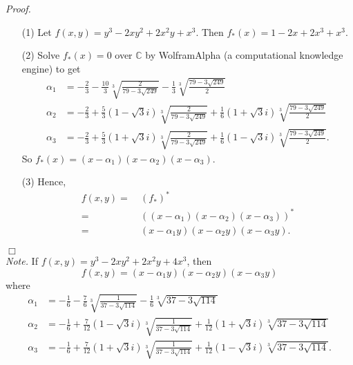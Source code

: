 \documentclass{article}
\begin{document}
\emph{Proof.}
\begin{enumerate}
\item[(1)]
  Let $f(x,y) = y^3 - 2xy^2 + 2x^2y + x^3$.
  Then $f_*(x) = 1 - 2x + 2x^3 + x^3$.

\item[(2)]
  Solve $f_*(x) = 0$ over $\mathbb{C}$ by WolframAlpha (a computational knowledge engine) to get
  \begin{align*}
    \alpha_1
    &= - \frac{2}{3} - \frac{10}{3} \sqrt[3]{\frac{2}{79 - 3\sqrt{249}}}
      - \frac{1}{3} \sqrt[3]{\frac{79 - 3\sqrt{249}}{2}} \\
    \alpha_2
    &= - \frac{2}{3} + \frac{5}{3}(1 - \sqrt{3}i) \sqrt[3]{\frac{2}{79 - 3\sqrt{249}}}
      + \frac{1}{6}(1 + \sqrt{3}i) \sqrt[3]{\frac{79 - 3\sqrt{249}}{2}} \\
    \alpha_3
    &= - \frac{2}{3} + \frac{5}{3}(1 + \sqrt{3}i) \sqrt[3]{\frac{2}{79 - 3\sqrt{249}}}
      + \frac{1}{6}(1 - \sqrt{3}i) \sqrt[3]{\frac{79 - 3\sqrt{249}}{2}}.
  \end{align*}
  So $f_*(x) = (x - \alpha_1)(x - \alpha_2)(x - \alpha_3)$.

\item[(3)]
  Hence,
  \begin{align*}
    f(x,y)
    =& \: (f_*)^{*} \\
    =& \: ((x - \alpha_1)(x - \alpha_2)(x - \alpha_3))^{*} \\
    =& \: (x - \alpha_1 y)(x - \alpha_2 y)(x - \alpha_3 y).
  \end{align*}
\end{enumerate}
$\Box$ \\

\emph{Note.}
  If $f(x,y) = y^3 - 2xy^2 + 2x^2y + 4x^3$, then
  \[
    f(x,y) = (x - \alpha_1 y)(x - \alpha_2 y)(x - \alpha_3 y)
  \]
  where
  \begin{align*}
    \alpha_1
    &= - \frac{1}{6} - \frac{7}{6} \sqrt[3]{\frac{1}{37 - 3\sqrt{114}}}
      - \frac{1}{6} \sqrt[3]{37 - 3\sqrt{114}} \\
    \alpha_2
    &= - \frac{1}{6} + \frac{7}{12}(1 - \sqrt{3}i) \sqrt[3]{\frac{1}{37 - 3\sqrt{114}}}
      + \frac{1}{12}(1 + \sqrt{3}i) \sqrt[3]{37 - 3\sqrt{114}} \\
    \alpha_3
    &= - \frac{1}{6} + \frac{7}{12}(1 + \sqrt{3}i) \sqrt[3]{\frac{1}{37 - 3\sqrt{114}}}
      + \frac{1}{12}(1 - \sqrt{3}i) \sqrt[3]{37 - 3\sqrt{114}}.
  \end{align*} \\
\end{document}
